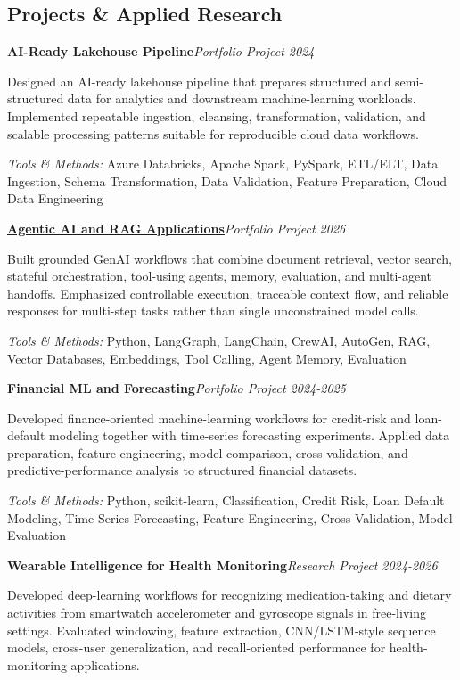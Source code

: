 \documentclass[9pt,letterpaper]{extarticle}
\newcommand{\entry}[2]{\Needspace{4\baselineskip}\textbf{#1}\hfill\textit{#2}\par}
\begin{document}
\subsection{Projects \& Applied Research}
\entry{AI-Ready Lakehouse Pipeline}{Portfolio Project \textbar{} 2024}
Designed an AI-ready lakehouse pipeline that prepares structured and semi-structured data for analytics and downstream machine-learning workloads. Implemented repeatable ingestion, cleansing, transformation, validation, and scalable processing patterns suitable for reproducible cloud data workflows.\par
{\small\textit{Tools \& Methods:} Azure Databricks, Apache Spark, PySpark, ETL/ELT, Data Ingestion, Schema Transformation, Data Validation, Feature Preparation, Cloud Data Engineering\par}
\vspace{1pt}
\entry{\href{https://github.com/WaseemRaza844/agentic-ai-projects-by-was}{Agentic AI and RAG Applications}}{Portfolio Project \textbar{} 2026}
Built grounded GenAI workflows that combine document retrieval, vector search, stateful orchestration, tool-using agents, memory, evaluation, and multi-agent handoffs. Emphasized controllable execution, traceable context flow, and reliable responses for multi-step tasks rather than single unconstrained model calls.\par
{\small\textit{Tools \& Methods:} Python, LangGraph, LangChain, CrewAI, AutoGen, RAG, Vector Databases, Embeddings, Tool Calling, Agent Memory, Evaluation\par}
\vspace{1pt}
\entry{Financial ML and Forecasting}{Portfolio Project \textbar{} 2024-2025}
Developed finance-oriented machine-learning workflows for credit-risk and loan-default modeling together with time-series forecasting experiments. Applied data preparation, feature engineering, model comparison, cross-validation, and predictive-performance analysis to structured financial datasets.\par
{\small\textit{Tools \& Methods:} Python, scikit-learn, Classification, Credit Risk, Loan Default Modeling, Time-Series Forecasting, Feature Engineering, Cross-Validation, Model Evaluation\par}
\vspace{1pt}
\entry{Wearable Intelligence for Health Monitoring}{Research Project \textbar{} 2024-2026}
Developed deep-learning workflows for recognizing medication-taking and dietary activities from smartwatch accelerometer and gyroscope signals in free-living settings. Evaluated windowing, feature extraction, CNN/LSTM-style sequence models, cross-user generalization, and recall-oriented performance for health-monitoring applications.\par
\end{document}
